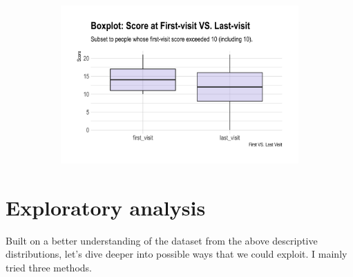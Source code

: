 \documentclass[11pt]{article}
\begin{document}
\begin{figure}[htb!]
\begin{subfigure}[h]{0.48\linewidth}
 		\caption{}\label{fig:p10}
 	\end{subfigure}
 	\hfill
 	\begin{subfigure}[h]{0.48\linewidth}
 		\includegraphics[width=\linewidth]{Figures/p6.png}
 		\caption{}\label{fig:p6}
 	\end{subfigure}
 \end{figure}

\section{Exploratory analysis} \label{ss:sec2}

Built on a better understanding of the dataset from the above descriptive distributions, let's dive deeper into possible ways that we could exploit. I mainly tried three methods.
\end{document}

